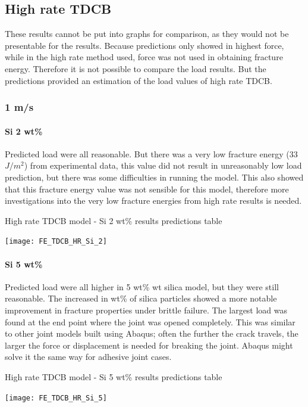 \documentclass[numbers=noendperiod,chapterprefix=on]{icldt} %
\begin{document}
{\subsection{High rate TDCB}
These results cannot be put into graphs for comparison, as they would not be presentable for the results.
Because predictions only showed in highest force, while in the high rate method used, force was not used in obtaining fracture energy. Therefore it is not possible to compare the load results. But the predictions provided an estimation of the load values of high rate TDCB.


\subsubsection{1 m/s}
\paragraph{Si 2 wt\%}
Predicted load were all reasonable. But there was a very low fracture energy (33 $J/m^{2}$) from experimental data, this value did not result in unreasonably low load prediction, but there was some difficulties in running the model. This also showed that this fracture energy value was not sensible for this model, therefore more investigations into the very low fracture energies from high rate results is needed.

\begin{table}[!htpb]
    \centering
    \caption{High rate TDCB model - Si 2 wt\% results predictions table}\label{FE_TDCB_HR_Si_2}
    \texttt{[image: FE\_TDCB\_HR\_Si\_2]}
    \end{table}
    \FloatBarrier

\paragraph{Si 5 wt\%}
Predicted load were all higher in 5 wt\% wt silica model, but they were still reasonable. The increased in wt\% of silica particles showed a more notable improvement in fracture properties under brittle failure. The largest load was found at the end point where the joint was opened completely. This was similar to other joint models built using Abaqus; often the further the crack travels, the larger the force or displacement is needed for breaking the joint. Abaqus might solve it the same way for adhesive joint cases.

\begin{table}[!htpb]
    \centering
    \caption{High rate TDCB model - Si 5 wt\% results predictions table}\label{FE_TDCB_HR_Si_5}
    \texttt{[image: FE\_TDCB\_HR\_Si\_5]}
    \end{table}
    \FloatBarrier
    
}
\end{document}
